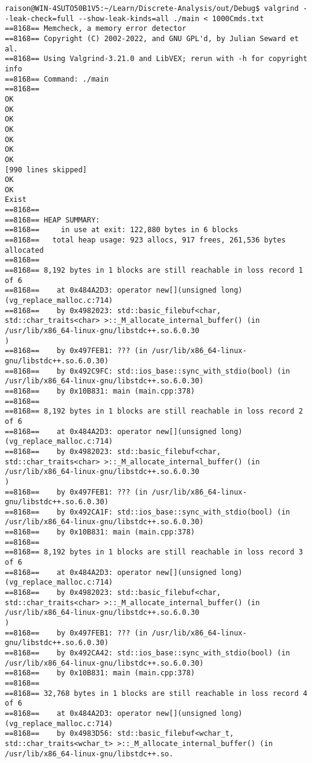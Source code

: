 \begin{Verbatim}[breaklines=true]
raison@WIN-4SUTO50B1V5:~/Learn/Discrete-Analysis/out/Debug$ valgrind --leak-check=full --show-leak-kinds=all ./main < 1000Cmds.txt 
==8168== Memcheck, a memory error detector
==8168== Copyright (C) 2002-2022, and GNU GPL'd, by Julian Seward et al.
==8168== Using Valgrind-3.21.0 and LibVEX; rerun with -h for copyright info
==8168== Command: ./main
==8168== 
OK
OK
OK
OK
OK
OK
OK
[990 lines skipped]
OK
OK
Exist
==8168== 
==8168== HEAP SUMMARY:
==8168==     in use at exit: 122,880 bytes in 6 blocks
==8168==   total heap usage: 923 allocs, 917 frees, 261,536 bytes allocated
==8168== 
==8168== 8,192 bytes in 1 blocks are still reachable in loss record 1 of 6
==8168==    at 0x484A2D3: operator new[](unsigned long) (vg_replace_malloc.c:714)
==8168==    by 0x4982023: std::basic_filebuf<char, std::char_traits<char> >::_M_allocate_internal_buffer() (in /usr/lib/x86_64-linux-gnu/libstdc++.so.6.0.30
)
==8168==    by 0x497FEB1: ??? (in /usr/lib/x86_64-linux-gnu/libstdc++.so.6.0.30)
==8168==    by 0x492C9FC: std::ios_base::sync_with_stdio(bool) (in /usr/lib/x86_64-linux-gnu/libstdc++.so.6.0.30)
==8168==    by 0x10B831: main (main.cpp:378)
==8168== 
==8168== 8,192 bytes in 1 blocks are still reachable in loss record 2 of 6
==8168==    at 0x484A2D3: operator new[](unsigned long) (vg_replace_malloc.c:714)
==8168==    by 0x4982023: std::basic_filebuf<char, std::char_traits<char> >::_M_allocate_internal_buffer() (in /usr/lib/x86_64-linux-gnu/libstdc++.so.6.0.30
)
==8168==    by 0x497FEB1: ??? (in /usr/lib/x86_64-linux-gnu/libstdc++.so.6.0.30)
==8168==    by 0x492CA1F: std::ios_base::sync_with_stdio(bool) (in /usr/lib/x86_64-linux-gnu/libstdc++.so.6.0.30)
==8168==    by 0x10B831: main (main.cpp:378)
==8168== 
==8168== 8,192 bytes in 1 blocks are still reachable in loss record 3 of 6
==8168==    at 0x484A2D3: operator new[](unsigned long) (vg_replace_malloc.c:714)
==8168==    by 0x4982023: std::basic_filebuf<char, std::char_traits<char> >::_M_allocate_internal_buffer() (in /usr/lib/x86_64-linux-gnu/libstdc++.so.6.0.30
)
==8168==    by 0x497FEB1: ??? (in /usr/lib/x86_64-linux-gnu/libstdc++.so.6.0.30)
==8168==    by 0x492CA42: std::ios_base::sync_with_stdio(bool) (in /usr/lib/x86_64-linux-gnu/libstdc++.so.6.0.30)
==8168==    by 0x10B831: main (main.cpp:378)
==8168== 
==8168== 32,768 bytes in 1 blocks are still reachable in loss record 4 of 6
==8168==    at 0x484A2D3: operator new[](unsigned long) (vg_replace_malloc.c:714)
==8168==    by 0x4983D56: std::basic_filebuf<wchar_t, std::char_traits<wchar_t> >::_M_allocate_internal_buffer() (in /usr/lib/x86_64-linux-gnu/libstdc++.so.

\end{Verbatim}

